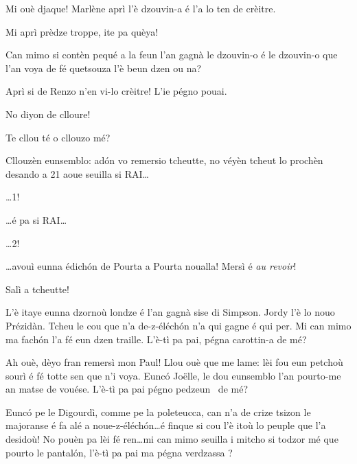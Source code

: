 \begin{drama}
\Brunospeaks Mi ouè djaque! Marlène aprì l'è dzouvin-a é l'a lo ten de crèitre.

\Noteospeaks Mi aprì prèdze troppe, ite pa quèya!

\Brunospeaks Can mimo si contèn pequé a la feun l'an gagnà le dzouvin-o é le dzouvin-o que l'an voya de fé quetsouza l'è beun dzen ou na?

\Noteospeaks  Aprì si de Renzo n'en vi-lo crèitre! L'ie pégno pouai.

\Brunospeaks No diyon de clloure!

\Noteospeaks  Te cllou té o cllouzo mé?

\Brunospeaks  Cllouzèn eunsemblo: ad\'on vo remersio tcheutte, no véyèn tcheut lo prochèn desando a 21 aoue seuilla si RAI\ldots

\Noteospeaks \ldots 1!

\Brunospeaks  \ldots é pa si RAI\ldots
 
\Noteospeaks \ldots 2!
 
\Brunospeaks \ldots avouì eunna édich\'on de Pourta a Pourta noualla! Mersì é \textit{au revoir}!
 
\Noteospeaks Salì a tcheutte!
 


\ridoiver


\Presidanspeaks {} L'è itaye eunna dzornoù londze é l'an gagnà sise di Simpson. Jordy l’è lo nouo Prézidàn. Tcheu le cou que n’a de-z-éléch\'on n’a qui gagne é qui per. Mi can mimo ma fach\'on l’a fé eun dzen traille. L'è-tì pa pai, pégna carottin-a \carota de mé?


\Presidanspeaks Ah ouè, dèyo fran remersì mon Paul! Llou ouè que me lame: lèi fou eun petchoù sourì é fé totte sen que n'i voya. Eunc\'o Jo\"{e}lle, le dou eunsemblo l'an pourto-me an matse de vouése. L’è-tì pa pai pégno pedzeun \pulcino\ de mé?


\Presidanspeaks Eunc\'o pe le Digourdì, comme pe la poleteucca, can n'a de crize tsizon le majoranse é fa alé a noue-z-éléch\'on\ldots é finque si cou l’è itoù lo peuple que l’a desidoù! No pouèn pa lèi fé ren\ldots mi can mimo seuilla i mitcho si todzor mé que pourto le pantal\'on, l'è-tì pa pai ma pégna verdzassa \scoiattolo ?


\end{drama}
